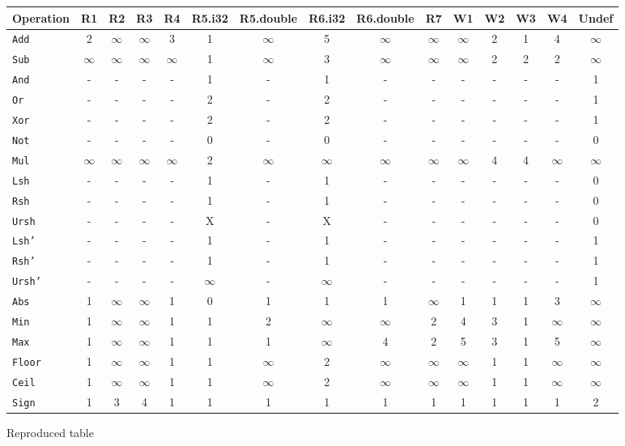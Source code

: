 \documentclass{article}
\begin{document}
\newcommand\oo{$\infty$}
\begin{figure}[t]
\small
\centering
\begin{tabular}{lccccccccc|cccc|c} \toprule
Operation &    \textbf{R1} & \textbf{R2} & \textbf{R3} & \textbf{R4} & \textbf{R5.i32} & \textbf{R5.double} & \textbf{R6.i32} & \textbf{R6.double} & \textbf{R7} & \textbf{W1} & \textbf{W2} & \textbf{W3} & \textbf{W4} & \textbf{Undef} \\ 
\midrule
\texttt{Add} & 2 & \oo & \oo & 3 & 1 & \oo & 5 & \oo & \oo & \oo & 2 & 1 & 4 & \oo \\
\texttt{Sub} & \oo & \oo & \oo & \oo & 1 & \oo & 3 & \oo & \oo & \oo & 2 & 2 & 2 & \oo \\
\texttt{And} & -  & -  & -  & -  & 1 & -  & 1 & -  & -  & -  & -  & -  & -  & 1 \\
\texttt{Or} & -  & -  & -  & -  & 2 & -  & 2 & -  & -  & -  & -  & -  & -  & 1 \\
\texttt{Xor} & -  & -  & -  & -  & 2 & -  & 2 & -  & -  & -  & -  & -  & -  & 1 \\
\texttt{Not} & -  & -  & -  & -  & 0 & -  & 0 & -  & -  & -  & -  & -  & -  & 0 \\
\texttt{Mul} & \oo & \oo & \oo & \oo & 2 & \oo & \oo & \oo & \oo & \oo & 4 & 4 & \oo & \oo \\
\texttt{Lsh} & -  & -  & -  & -  & 1 & -  & 1 & -  & -  & -  & -  & -  & -  & 0 \\
\texttt{Rsh} & -  & -  & -  & -  & 1 & -  & 1 & -  & -  & -  & -  & -  & -  & 0 \\
\texttt{Ursh} & -  & -  & -  & -  & X & -  & X & -  & -  & -  & -  & -  & -  & 0 \\
\texttt{Lsh'} & -  & -  & -  & -  & 1 & -  & 1 & -  & -  & -  & -  & -  & -  & 1 \\
\texttt{Rsh'} & -  & -  & -  & -  & 1 & -  & 1 & -  & -  & -  & -  & -  & -  & 1 \\
\texttt{Ursh'} & -  & -  & -  & -  & \oo & -  & \oo & -  & -  & -  & -  & -  & -  & 1 \\
\texttt{Abs} & 1 & \oo & \oo & 1 & 0 & 1 & 1 & 1 & \oo & 1 & 1 & 1 & 3 & \oo \\
\texttt{Min} & 1 & \oo & \oo & 1 & 1 & 2 & \oo & \oo & 2 & 4 & 3 & 1 & \oo & \oo \\
\texttt{Max} & 1 & \oo & \oo & 1 & 1 & 1 & \oo & 4 & 2 & 5 & 3 & 1 & 5 & \oo \\
\texttt{Floor} & 1 & \oo & \oo & 1 & 1 & \oo & 2 & \oo & \oo & \oo & 1 & 1 & \oo & \oo \\
\texttt{Ceil} & 1 & \oo & \oo & 1 & 1 & \oo & 2 & \oo & \oo & \oo & 1 & 1 & \oo & \oo \\
\texttt{Sign} & 1 & 3 & 4 & 1 & 1 & 1 & 1 & 1 & 1 & 1 & 1 & 1 & 1 & 2 \\
\end{tabular}
\vspace*{-3.5mm}
\caption{Reproduced table}
\end{figure}
\end{document}
